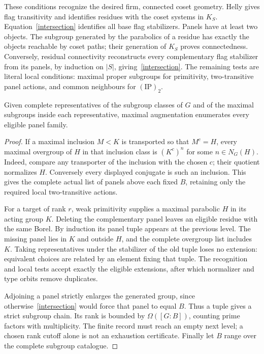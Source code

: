 These conditions recognize the desired firm, connected coset geometry.
Helly gives flag transitivity and identifies residues with the coset
systems in $K_S$. Equation~\eqref{intersection} identifies all base flag
stabilizers. Panels have at least two objects. The subgroup generated
by the parabolics of a residue has exactly the objects reachable by
coset paths; their generation of $K_S$ proves connectedness. Conversely,
residual connectivity reconstructs every complementary flag stabilizer
from its panels, by induction on $|S|$, giving~\eqref{intersection}.
The remaining tests are literal local conditions: maximal proper
subgroups for primitivity, two-transitive panel actions, and common
neighbours for $(\mathrm{IP})_2$.

\begin{lemma}\label{augmentation}
Given complete representatives of the subgroup classes of $G$ and of
the maximal subgroups inside each representative, maximal augmentation
enumerates every eligible panel family.
\end{lemma}
\begin{proof}
If a maximal inclusion $M<K$ is transported so that $M^c=H$, every
maximal overgroup of $H$ in that inclusion class is $(K^c)^n$ for some
$n\in N_G(H)$. Indeed, compare any transporter of the inclusion with
the chosen $c$; their quotient normalizes $H$. Conversely every displayed
conjugate is such an inclusion. This gives the complete actual list
of panels above each fixed $B$, retaining only the required local
two-transitive actions.

For a target of rank $r$, weak primitivity supplies a maximal parabolic
$H$ in its acting group $K$. Deleting the complementary panel leaves
an eligible residue with the same Borel. By induction its panel tuple
appears at the previous level. The missing panel lies in $K$ and outside
$H$, and the complete overgroup list includes $K$. Taking representatives
under the stabilizer of the old tuple loses no extension: equivalent
choices are related by an element fixing that tuple. The recognition
and local tests accept exactly the eligible extensions, after which
normalizer and type orbits remove duplicates.

Adjoining a panel strictly enlarges the generated group, since
otherwise~\eqref{intersection} would force that panel to equal $B$.
Thus a tuple gives a strict subgroup chain. Its rank is bounded by
$\Omega([G:B])$, counting prime factors with multiplicity. The finite
record must reach an empty next level; a chosen rank cutoff alone is
not an exhaustion certificate. Finally let $B$ range over the complete
subgroup catalogue.
\end{proof}

